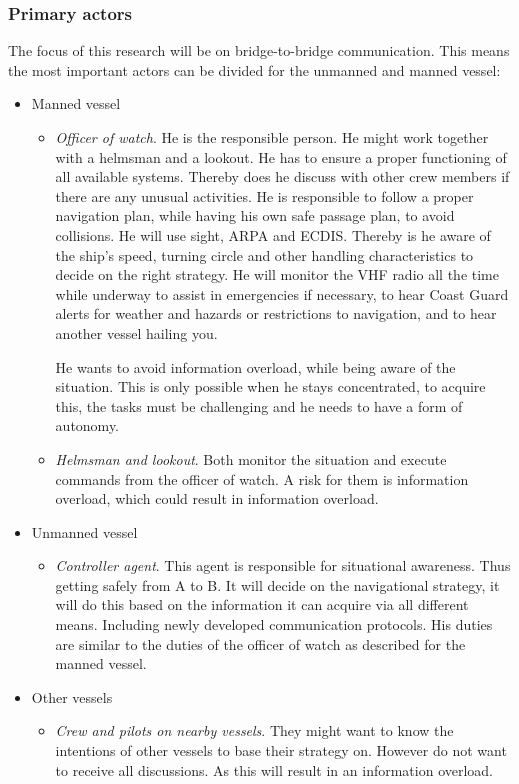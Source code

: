 \subsubsection{Primary actors}
The focus of this research will be on bridge-to-bridge communication. This means the most important actors can be divided for the unmanned and manned vessel:
\begin{itemize}
	\item Manned vessel
	\begin{itemize}
		\item \emph{Officer of watch}. He is the responsible person. He might work together with a helmsman and a lookout. He has to ensure a proper functioning of all available systems. Thereby does he discuss with other crew members if there are any unusual activities. He is responsible to follow a proper navigation plan, while having his own safe passage plan, to avoid collisions. He will use sight, \ac{ARPA} and \ac{ECDIS}. Thereby is he aware of the ship's speed, turning circle and other handling characteristics to decide on the right strategy. He will monitor the \ac{VHF} radio all the time while underway to assist in emergencies if necessary, to hear Coast Guard alerts for weather and hazards or restrictions to navigation, and to hear another vessel hailing you.
		
		He wants to avoid information overload, while being aware of the situation. This is only possible when he stays concentrated, to acquire this, the tasks must be challenging and he needs to have a form of autonomy.
	
		\item \emph{Helmsman and lookout}. Both monitor the situation and execute commands from the officer of watch. A risk for them is information overload, which could result in information overload. 
	\end{itemize}
		
	\item Unmanned vessel
	\begin{itemize}
		\item \emph{Controller agent}. This agent is responsible for situational awareness. Thus getting safely from A to B. It will decide on the navigational strategy, it will do this based on the information it can acquire via all different means. Including newly developed communication protocols. His duties are similar to the duties of the officer of watch as described for the manned vessel.
	\end{itemize}

	\item Other vessels
	\begin{itemize}
		\item \emph{Crew and pilots on nearby vessels}. They might want to know the intentions of other vessels to base their strategy on. However do not want to receive all discussions. As this will result in an information overload.
	\end{itemize}
	
\end{itemize}


